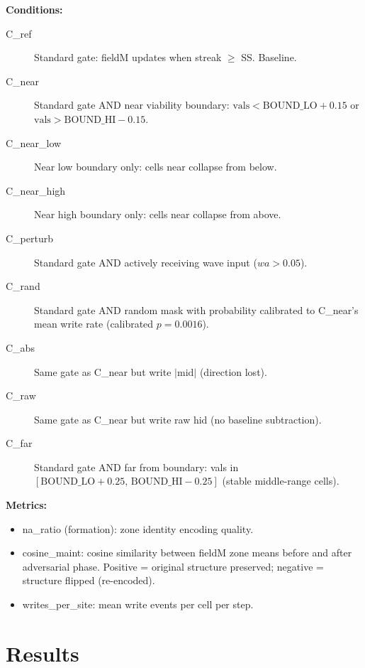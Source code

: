 \documentclass[11pt,a4paper]{article}
\begin{document}
\textbf{Conditions:}
\begin{description}
  \item[C\_ref] Standard gate: fieldM updates when streak $\geq$ SS. Baseline.
  \item[C\_near] Standard gate AND near viability boundary:
    $\text{vals} < \text{BOUND\_LO}+0.15$ or $\text{vals} > \text{BOUND\_HI}-0.15$.
  \item[C\_near\_low] Near low boundary only: cells near collapse from below.
  \item[C\_near\_high] Near high boundary only: cells near collapse from above.
  \item[C\_perturb] Standard gate AND actively receiving wave input ($wa > 0.05$).
  \item[C\_rand] Standard gate AND random mask with probability calibrated to
    C\_near's mean write rate (calibrated $p=0.0016$).
  \item[C\_abs] Same gate as C\_near but write $|\mathrm{mid}|$ (direction lost).
  \item[C\_raw] Same gate as C\_near but write raw hid (no baseline subtraction).
  \item[C\_far] Standard gate AND far from boundary: vals in
    $[\text{BOUND\_LO}+0.25,\, \text{BOUND\_HI}-0.25]$ (stable middle-range cells).
\end{description}

\textbf{Metrics:}
\begin{itemize}
  \item na\_ratio (formation): zone identity encoding quality.
  \item cosine\_maint: cosine similarity between fieldM zone means
    before and after adversarial phase.
    Positive = original structure preserved; negative = structure flipped (re-encoded).
  \item writes\_per\_site: mean write events per cell per step.
\end{itemize}

\section{Results}
\end{document}

